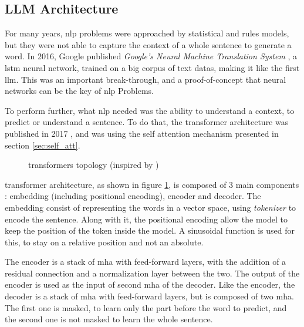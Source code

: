 
\subsection{LLM Architecture}
\label{sec:llm_arch}
For many years, \acrshort{nlp} problems were approached by statistical and rules models, but they were not able to capture the context of a whole sentence to generate a word. In 2016, Google published \textit{Google's Neural Machine Translation System} \cite{wu_googles_2016}, a \acrfull{lstm} neural network, trained on a big corpus of text datas, making it like the first \acrlong{llm}. This was an important break-through, and a proof-of-concept that neural networks can be the key of \acrshort{nlp} Problems.

To perform further, what \acrshort{nlp} needed was the ability to understand a context, to predict or understand a sentence. To do that, the \Gls{transformer} architecture was published in 2017 \cite{vaswani_attention_2017}, and was using the self attention mechanism presented in section \ref{sec:self_att}. 

\begin{figure}[h]
    \centering
    
    \caption{\Glspl{transformer} topology (inspired by \cite{vaswani_attention_2017})}
    \label{fig:transformers}
\end{figure}

\Gls{transformer} architecture, as shown in figure \ref{fig:transformers}, is composed of 3 main components : embedding (including positional encoding), encoder and decoder. The embedding consist of representing the words in a vector space, using \textit{tokenizer} to encode the sentence.  Along with it, the positional encoding allow the model to keep the position of the token inside the model. A sinusoidal function is used for this, to stay on a relative position and not an absolute.

The encoder is a stack of \acrshort{mha} with feed-forward layers, with the addition of a residual connection and a normalization layer between the two. The output of the encoder is used as the input of second \acrshort{mha} of the decoder. Like the encoder, the decoder is a stack of \acrshort{mha} with feed-forward layers, but is composed of two \acrshort{mha}. The first one is masked, to learn only the part before the word to predict, and the second one is not masked to learn the whole sentence.

